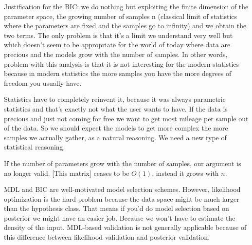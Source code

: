 \documentclass[12pt]{article}
\begin{document}
\par Justification for the BIC: we do nothing but exploiting the finite dimension of the parameter space, the growing number of samples n (classical limit of statistics where the parameters are fixed and the samples go to infinity) and we obtain the two terms. The only problem is that it's a limit we understand very well but which doesn't seem to be appropriate for the world of today where data are precious and the models grow with the number of samples. In other words, problem with this analysis is that it is not interesting for the modern statistics because in modern statistics the more samples you have the more degrees of freedom you usually have.
\par Statistics have to completely reinvent it, because it was always parametric statistics and that's exactly not what the user wants to have. If the data is precious and just not coming for free we want to get most mileage per sample out of the data. So we should expect the models to get more complex the more samples we actually gather, as a natural reasoning. We need a new type of statistical reasoning.
\par If the number of parameters grow with the number of samples, our argument is no longer valid. [This matrix] ceases to be $O(1)$, instead it grows with $n$.
\par MDL and BIC are well-motivated model selection schemes. However, likelihood optimization is the hard problem because the data space might be much larger than the hypothesis class. That means if you'd do model selection based on posterior we might have an easier job. Because we won't have to estimate the density of the input. MDL-based validation is not generally applicable because of this difference between likelihood validation and posterior validation.
\end{document}
